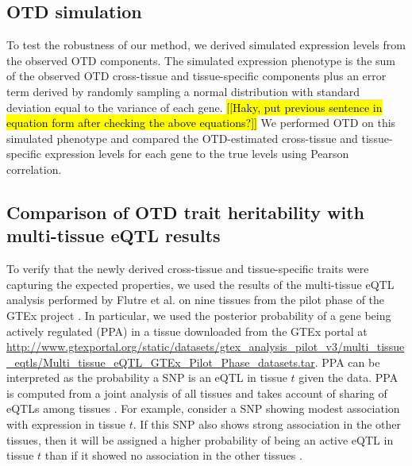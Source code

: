 \documentclass[10pt,letterpaper]{article}
\begin{document}
\subsection*{OTD simulation}

To test the robustness of our method, we derived simulated expression levels from the observed OTD components. The simulated expression phenotype is the sum of the observed OTD cross-tissue and tissue-specific components plus an error term derived by randomly sampling a normal distribution with standard deviation equal to the variance of each gene. \hl{[[Haky, put previous sentence in equation form after checking the above equations?]]} We performed OTD on this simulated phenotype and compared the OTD-estimated cross-tissue and tissue-specific expression levels for each gene to the true levels using Pearson correlation.

\subsection*{Comparison of OTD trait heritability with multi-tissue eQTL
results}\label{comparison-of-otd-pve-to-multi-tissue-eqtl-results}

To verify that the newly derived cross-tissue and tissue-specific traits were capturing the expected properties, we used the results of the multi-tissue eQTL analysis performed by Flutre et al. \cite{Flutre_2013}
on nine tissues from the pilot phase of the GTEx project \cite{Ardlie_2015}. %
In particular, we used the posterior probability of a gene being actively regulated (PPA) in a tissue downloaded from the GTEx portal at \url{http://www.gtexportal.org/static/datasets/gtex_analysis_pilot_v3/multi_tissue_eqtls/Multi_tissue_eQTL_GTEx_Pilot_Phase_datasets.tar}. PPA can be interpreted as
the probability a SNP is an eQTL in tissue \(t\) given the data. PPA is computed from a joint analysis of all tissues and takes account of sharing of eQTLs among tissues \cite{Flutre_2013}. For example, consider a SNP showing modest association with expression in tissue \(t\). If this SNP also shows strong association in the other tissues, then it will be assigned a higher probability of being an active eQTL in tissue \(t\) than if it showed no association in the other tissues \cite{Flutre_2013}.
\end{document}
